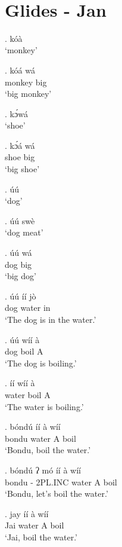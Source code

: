 \documentclass{assets/fieldnotes}
\begin{document}
\\ 


\section{Glides - Jan}

\ex. kóà \\
`monkey'

\exg. kóá wá \\
monkey big \\
`big monkey'

\ex. kɔ́wá \\
`shoe'
    
\exg. kɔ́á wá \\
shoe big \\
`big shoe'

\ex. úú \\
`dog'

\ex. úú swè \\
`dog meat'

\exg. úú wá \\
dog big \\
`big dog' 

\exg. úú íí jò\\
dog water in \\
`The dog is in the water.'

\exg. úú wíí à \\
dog boil A \\
`The dog is boiling.'

\exg. íí wíí à \\
water boil A \\
`The water is boiling.'

\exg. bóndú íí à wíí \\
bondu water A boil\\
`Bondu, boil the water.'

\exg.  bóndú ʔ mó íí à wíí \\
bondu - 2PL.INC water A boil \\
`Bondu, let's boil the water.'

\exg. jay íí à wíí\\
Jai water A boil \\
`Jai, boil the water.'
\end{document}
